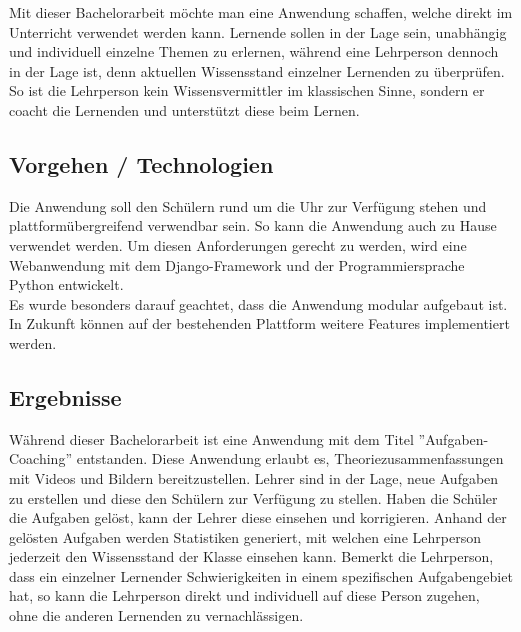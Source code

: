 Mit dieser Bachelorarbeit möchte man eine Anwendung schaffen, welche direkt im Unterricht verwendet werden kann. Lernende sollen in der Lage sein, unabhängig und individuell einzelne Themen zu erlernen, während eine Lehrperson dennoch in der Lage ist, denn aktuellen Wissensstand einzelner Lernenden zu überprüfen. So ist die Lehrperson kein Wissensvermittler im klassischen Sinne, sondern er coacht die Lernenden und unterstützt diese beim Lernen.



\subsection{Vorgehen / Technologien}
Die Anwendung soll den Schülern rund um die Uhr zur Verfügung stehen und plattformübergreifend verwendbar sein. So kann die Anwendung auch zu Hause verwendet werden. Um diesen Anforderungen gerecht zu werden, wird eine Webanwendung mit dem Django-Framework und der Programmiersprache Python entwickelt. \\
Es wurde besonders darauf geachtet, dass die Anwendung modular aufgebaut ist. In Zukunft können auf der bestehenden Plattform weitere Features implementiert werden.

\subsection{Ergebnisse}
Während dieser Bachelorarbeit ist eine Anwendung mit dem Titel ''Aufgaben-Coaching'' entstanden. Diese Anwendung erlaubt es, Theoriezusammenfassungen mit Videos und Bildern bereitzustellen. Lehrer sind in der Lage, neue Aufgaben zu erstellen und diese den Schülern zur Verfügung zu stellen. Haben die Schüler die Aufgaben gelöst, kann der Lehrer diese einsehen und korrigieren. Anhand der gelösten Aufgaben werden Statistiken generiert, mit welchen eine Lehrperson jederzeit den Wissensstand der Klasse einsehen kann. Bemerkt die Lehrperson, dass ein einzelner Lernender Schwierigkeiten in einem spezifischen Aufgabengebiet hat, so kann die Lehrperson direkt und individuell auf diese Person zugehen, ohne die anderen Lernenden zu vernachlässigen.


